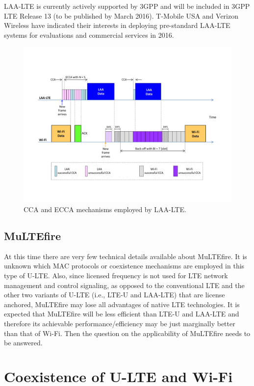 LAA-LTE is currently actively supported by 3GPP and will be included in 3GPP LTE Release 13 (to be published by March 2016). T-Mobile USA and Verizon Wireless have indicated their interests in deploying pre-standard LAA-LTE systems for evaluations and commercial services in 2016.

\begin{figure}[!t]
	\centering
	\includegraphics[width=0.9\columnwidth]{figures2/LAA-LTE}
	\caption{CCA and ECCA mechanisms employed by LAA-LTE.}
	\label{figs:LAA-LTE}
\end{figure}

\subsection{MuLTEfire}

At this time there are very few technical details available about MuLTEfire. It is unknown which MAC protocols or coexistence mechanisms are employed in this type of U-LTE. Also, since licensed frequency is not used for LTE network management and control signaling, as opposed to the conventional LTE and the other two variants of U-LTE (i.e., LTE-U and LAA-LTE) that are license anchored, MuLTEfire may lose all advantages of native LTE technologies. It is expected that MuLTEfire will be less efficient than LTE-U and LAA-LTE and therefore its achievable performance/efficiency may be just marginally better than that of Wi-Fi. Then the question on the applicability of MuLTEfire needs to be answered.


\section{Coexistence of U-LTE and Wi-Fi}
\label{coexist}

